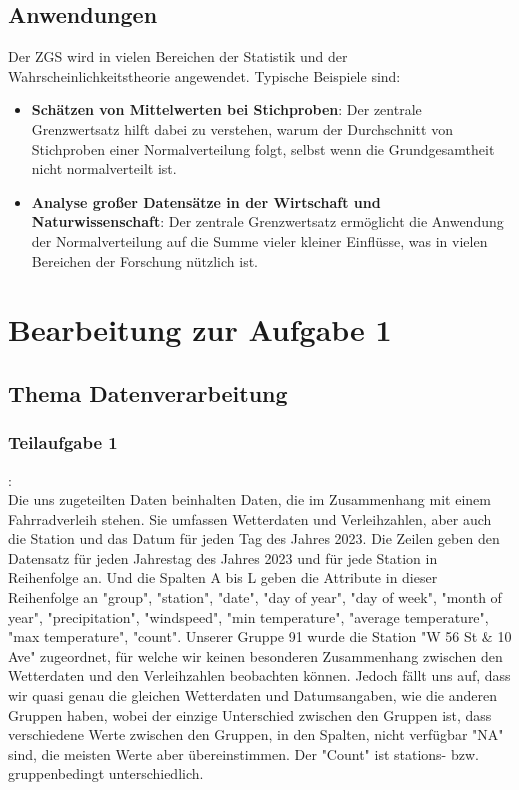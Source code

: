 \documentclass[a4paper,12pt]{article}
\begin{document}
\subsection{Anwendungen}
Der ZGS wird in vielen Bereichen der Statistik und der Wahrscheinlichkeitstheorie angewendet. Typische Beispiele sind:

\begin{itemize}
    \item \textbf{Schätzen von Mittelwerten bei Stichproben}: Der zentrale Grenzwertsatz hilft dabei zu verstehen, warum der Durchschnitt von Stichproben einer Normalverteilung folgt, selbst wenn die Grundgesamtheit nicht normalverteilt ist.
    \item \textbf{Analyse großer Datensätze in der Wirtschaft und Naturwissenschaft}: Der zentrale Grenzwertsatz ermöglicht die Anwendung der Normalverteilung auf die Summe vieler kleiner Einflüsse, was in vielen Bereichen der Forschung nützlich ist.
\end{itemize}

\newpage
\section{Bearbeitung zur Aufgabe 1}
\subsection{Thema Datenverarbeitung} 
\subsubsection {Teilaufgabe 1}: \\ Die uns zugeteilten Daten beinhalten Daten, die im Zusammenhang mit einem Fahrradverleih stehen. Sie umfassen Wetterdaten und Verleihzahlen, aber auch die Station und das Datum für jeden Tag des Jahres 2023. Die Zeilen geben den Datensatz für jeden Jahrestag des Jahres 2023 und für jede Station in Reihenfolge an. Und die Spalten A bis L geben die Attribute in dieser Reihenfolge an "group", "station", "date", "day of year", "day of week", "month of year", "precipitation", "windspeed", "min temperature", "average temperature", "max temperature", "count". Unserer Gruppe 91 wurde die Station "W 56 St & 10 Ave" zugeordnet, für welche wir keinen besonderen Zusammenhang zwischen den Wetterdaten und den Verleihzahlen beobachten können. Jedoch fällt uns auf, dass wir quasi genau die gleichen Wetterdaten und Datumsangaben, wie die anderen Gruppen haben, wobei der einzige Unterschied zwischen den Gruppen ist, dass verschiedene Werte zwischen den Gruppen, in den Spalten, nicht verfügbar "NA" sind, die meisten Werte aber übereinstimmen. Der "Count"  ist stations- bzw. gruppenbedingt unterschiedlich. 
\\
\end{document}
